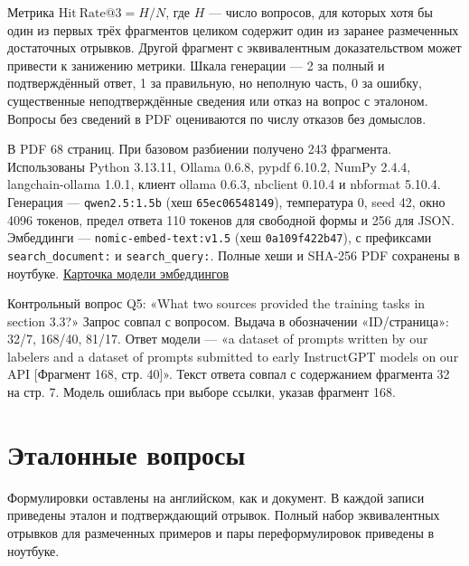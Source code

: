 \documentclass[12pt,a4paper]{article}
\begin{document}
Метрика \(\mathrm{Hit\ Rate}@3 = H/N\), где \(H\) --- число вопросов,
для которых хотя бы один из первых трёх фрагментов целиком содержит один
из заранее размеченных достаточных отрывков. Другой фрагмент с
эквивалентным доказательством может привести к занижению метрики. Шкала
генерации --- 2 за полный и подтверждённый ответ, 1 за правильную, но
неполную часть, 0 за ошибку, существенные неподтверждённые сведения или
отказ на вопрос с эталоном. Вопросы без сведений в PDF оцениваются по
числу отказов без домыслов.

В PDF 68 страниц. При базовом разбиении получено 243 фрагмента.
Использованы Python 3.13.11, Ollama 0.6.8, pypdf 6.10.2, NumPy 2.4.4,
langchain-ollama 1.0.1, клиент ollama 0.6.3, nbclient 0.10.4 и nbformat
5.10.4. Генерация --- \texttt{qwen2.5:1.5b} (хеш \texttt{65ec06548149}),
температура 0, seed 42, окно 4096 токенов, предел ответа 110 токенов для
свободной формы и 256 для JSON. Эмбеддинги ---
\texttt{nomic-embed-text:v1.5} (хеш \texttt{0a109f422b47}), с префиксами
\texttt{search\_document:} и \texttt{search\_query:}. Полные хеши и
SHA-256 PDF сохранены в ноутбуке.
\href{https://huggingface.co/nomic-ai/nomic-embed-text-v1.5}{Карточка
модели эмбеддингов}

Контрольный вопрос Q5: «What two sources provided the training tasks in
section 3.3?» Запрос совпал с вопросом. Выдача в обозначении
«ID/страница»: 32/7, 168/40, 81/17. Ответ модели --- «a dataset of
prompts written by our labelers and a dataset of prompts submitted to
early InstructGPT models on our API {[}Фрагмент 168, стр. 40{]}». Текст
ответа совпал с содержанием фрагмента 32 на стр. 7. Модель ошиблась при
выборе ссылки, указав фрагмент 168.

\hypertarget{ux44dux442ux430ux43bux43eux43dux43dux44bux435-ux432ux43eux43fux440ux43eux441ux44b}{%
\section{Эталонные
вопросы}\label{ux44dux442ux430ux43bux43eux43dux43dux44bux435-ux432ux43eux43fux440ux43eux441ux44b}}

Формулировки оставлены на английском, как и документ. В каждой записи
приведены эталон и подтверждающий отрывок. Полный набор эквивалентных
отрывков для размеченных примеров и пары переформулировок приведены в
ноутбуке.
\end{document}
